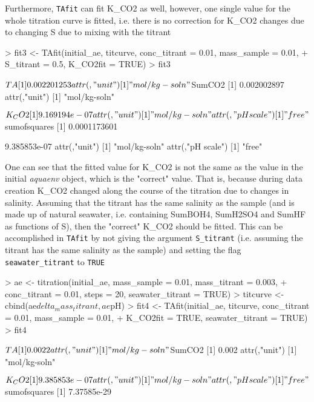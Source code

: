 \documentclass[article,nojss]{jss}
\begin{document}
Furthermore, \texttt{TAfit} can fit K\_CO2 as well, however, one single value for the whole titration curve is fitted, i.e. there is no correction for K\_CO2 changes due to changing S due to mixing with the titrant
\begin{Schunk}
\begin{Sinput}
> fit3 <- TAfit(initial_ae, titcurve, conc_titrant = 0.01, mass_sample = 0.01, 
+     S_titrant = 0.5, K_CO2fit = TRUE)
> fit3
\end{Sinput}
\begin{Soutput}
$TA
[1] 0.002201253
attr(,"unit")
[1] "mol/kg-soln"

$SumCO2
[1] 0.002002897
attr(,"unit")
[1] "mol/kg-soln"

$K_CO2
[1] 9.169194e-07
attr(,"unit")
[1] "mol/kg-soln"
attr(,"pH scale")
[1] "free"

$sumofsquares
[1] 0.0001173601
\end{Soutput}
\begin{Soutput}
[1] 9.385853e-07
attr(,"unit")
[1] "mol/kg-soln"
attr(,"pH scale")
[1] "free"
\end{Soutput}
\end{Schunk}

One can see that the fitted value for K\_CO2 is not the same as the value in the initial \textit{aquaenv} object, which is the "correct" value. That is, because during data creation K\_CO2 changed along the course of the titration
due to changes in salinity. Assuming that the titrant has the same salinity as the sample (and is made up of natural seawater, i.e. containing SumBOH4, SumH2SO4 and SumHF as functions of S),
 then the "correct" K\_CO2 should be fitted. This can be accomplished in \texttt{TAfit} by not giving the argument \texttt{S\_titrant} (i.e. assuming the titrant has the 
same salinity as the sample) and 
setting the flag \texttt{seawater\_titrant} to \texttt{TRUE}

\begin{Schunk}
\begin{Sinput}
> ae <- titration(initial_ae, mass_sample = 0.01, mass_titrant = 0.003, 
+     conc_titrant = 0.01, steps = 20, seawater_titrant = TRUE)
> titcurve <- cbind(ae$delta_mass_titrant, ae$pH)
> fit4 <- TAfit(initial_ae, titcurve, conc_titrant = 0.01, mass_sample = 0.01, 
+     K_CO2fit = TRUE, seawater_titrant = TRUE)
> fit4
\end{Sinput}
\begin{Soutput}
$TA
[1] 0.0022
attr(,"unit")
[1] "mol/kg-soln"

$SumCO2
[1] 0.002
attr(,"unit")
[1] "mol/kg-soln"

$K_CO2
[1] 9.385853e-07
attr(,"unit")
[1] "mol/kg-soln"
attr(,"pH scale")
[1] "free"

$sumofsquares
[1] 7.37585e-29
\end{Soutput}
\end{Schunk}
\end{document}
